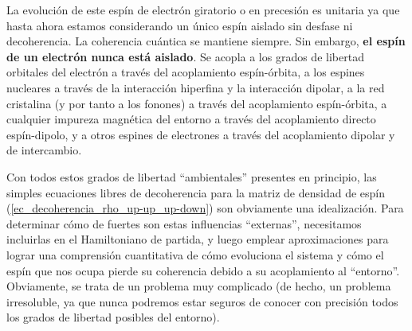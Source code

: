     La evolución de este espín de electrón giratorio o en precesión es unitaria ya que hasta ahora estamos considerando un único espín aislado sin desfase ni decoherencia. La coherencia cuántica se mantiene siempre. Sin embargo, \textbf{el espín de un electrón nunca está aislado}. Se acopla a los grados de libertad orbitales del electrón a través del acoplamiento espín-órbita, a los espines nucleares a través de la interacción hiperfina y la interacción dipolar, a la red cristalina (y por tanto a los fonones) a través del acoplamiento espín-órbita, a cualquier impureza magnética del entorno a través del acoplamiento directo espín-dipolo, y a otros espines de electrones a través del acoplamiento dipolar y de intercambio. 
    
    Con todos estos grados de libertad ``ambientales'' presentes en principio, las simples ecuaciones libres de decoherencia para la matriz de densidad de espín (\ref{ec_decoherencia_rho_up-up_up-down}) son obviamente una idealización. Para determinar cómo de fuertes son estas influencias ``externas'', necesitamos incluirlas en el Hamiltoniano de partida, y luego emplear aproximaciones para lograr una comprensión cuantitativa de cómo evoluciona el sistema y cómo el espín que nos ocupa pierde su coherencia debido a su acoplamiento al ``entorno''. Obviamente, se trata de un problema muy complicado (de hecho, un problema irresoluble, ya que nunca podremos estar seguros de conocer con precisión todos los grados de libertad posibles del entorno). 
    
